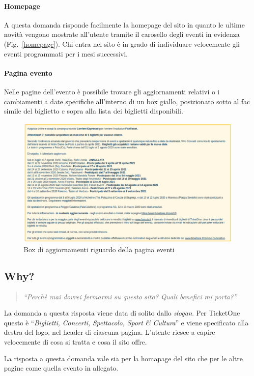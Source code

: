 	\paragraph{Homepage}
		A questa domanda risponde facilmente la homepage del sito in quanto le ultime novità vengono mostrate all'utente tramite il carosello degli eventi in evidenza (Fig.~\ref{homepage}).
		Chi entra nel sito è in grado di individuare velocemente gli eventi programmati per i mesi successivi.
	\paragraph{Pagina evento}
		Nelle pagine dell'evento è possibile trovare gli aggiornamenti relativi o i cambiamenti a date specifiche all'interno di un box giallo, posizionato sotto al fac simile del biglietto e sopra alla lista dei biglietti disponibili.
		\begin{figure}[hbt]
			\centering
			\includegraphics[width=\textwidth]{img/when.png}
			\caption{Box di aggiornamenti riguardo della pagina eventi}
			\label{when}
		\end{figure}
		
\subsection{Why?}
	\begin{quote}
		\emph{``Perchè mai dovrei fermarmi su questo sito? Quali benefici mi porta?''}
	\end{quote}
	La domanda a questa risposta viene data di solito dallo \textit{slogan}.
	Per TicketOne questo è ``\textit{Biglietti, Concerti, Spettacolo, Sport \& Cultura}'' e viene specificato alla destra del logo, nel header di ciascuna pagina.
	L'utente riesce a capire velocemente di cosa si tratta e cosa il sito offre.
	\par La risposta a questa domanda vale sia per la homapage del sito che per le altre pagine come quella evento in allegato.
		
